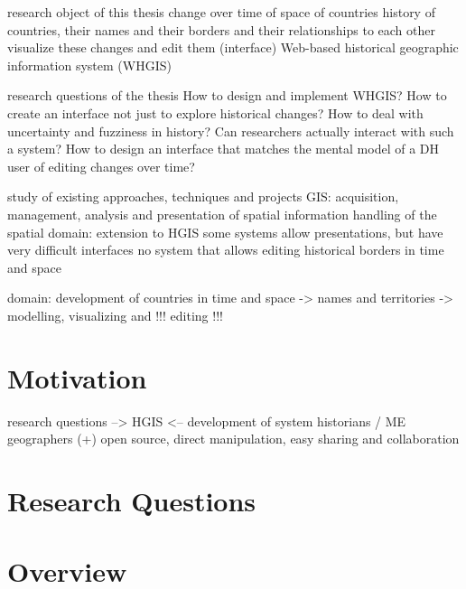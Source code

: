 research object of this thesis
  change over time of space of countries
  history of countries, their names and their borders and their relationships to each other
  visualize these changes and edit them (interface)
  Web-based historical geographic information system (WHGIS)

research questions of the thesis
  How to design and implement WHGIS?
  How to create an interface not just to explore historical changes?
  How to deal with uncertainty and fuzziness in history?
  Can researchers actually interact with such a system?
  How to design an interface that matches the mental model of a DH user of editing changes over time?

study of existing approaches, techniques and projects
  GIS: acquisition, management, analysis and presentation of spatial information
  handling of the spatial domain: extension to HGIS
  some systems allow presentations, but have very difficult interfaces
  no system that allows editing historical borders in time and space

domain: development of countries in time and space
-> names and territories
-> modelling, visualizing and !!! editing !!!

\section{Motivation} %
\label{sec:motivation}


research questions --> HGIS <-- development of system
  historians /                           ME
  geographers
(+) open source, direct manipulation, easy sharing and collaboration



\section{Research Questions} %
\label{sec:research_questions}




\section{Overview} %
\label{sec:overview}




